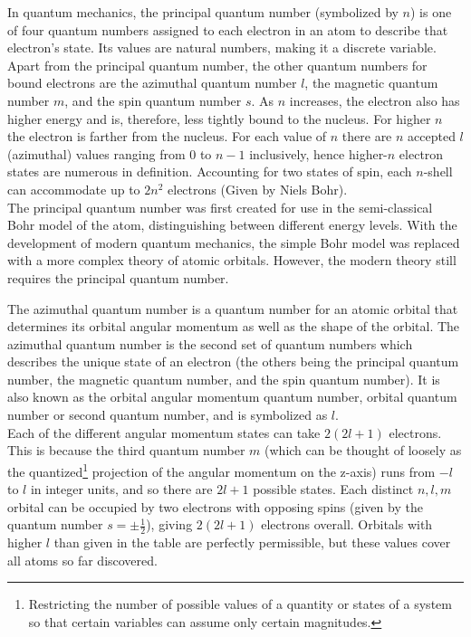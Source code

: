 \begin{chembox}{}
{In quantum mechanics, the principal quantum number (symbolized by $n$) is one of four quantum numbers assigned to each electron in an atom to describe that electron's state. Its values are natural numbers, making it a discrete variable.\\
Apart from the principal quantum number, the other quantum numbers for bound electrons are the azimuthal quantum number $l$, the magnetic quantum number $m$, and the spin quantum number $s$.
As $n$ increases, the electron also has higher energy and is, therefore, less tightly bound to the nucleus. For higher $n$ the electron is farther from the nucleus. For each value of $n$ there are $n$ accepted $l$ (azimuthal) values ranging from $0$ to $n - 1$ inclusively, hence higher-$n$ electron states are numerous in definition. Accounting for two states of spin, each $n$-shell can accommodate up to $2n^2$ electrons (Given by Niels Bohr).\\
The principal quantum number was first created for use in the semi-classical Bohr model of the atom, distinguishing between different energy levels. With the development of modern quantum mechanics, the simple Bohr model was replaced with a more complex theory of atomic orbitals. However, the modern theory still requires the principal quantum number.}
\end{chembox}
\begin{chembox}{}
{The azimuthal quantum number is a quantum number for an atomic orbital that determines its orbital angular momentum as well as the shape of the orbital. The azimuthal quantum number is the second set of quantum numbers which describes the unique state of an electron (the others being the principal quantum number, the magnetic quantum number, and the spin quantum number). It is also known as the orbital angular momentum quantum number, orbital quantum number or second quantum number, and is symbolized as $l$.\\
Each of the different angular momentum states can take $2(2l + 1)$ electrons. This is because the third quantum number $m$ (which can be thought of loosely as the quantized\footnote{Restricting the number of possible values of a quantity or states of a system so that certain variables can assume only certain magnitudes.} projection of the angular momentum on the z-axis) runs from $−l$ to $l$ in integer units, and so there are $2l + 1$ possible states. Each distinct $n, l, m$ orbital can be occupied by two electrons with opposing spins (given by the quantum number $s = \pm \frac{1}{2}$), giving $2(2l + 1)$ electrons overall. Orbitals with higher $l$ than given in the table are perfectly permissible, but these values cover all atoms so far discovered.}
\end{chembox}
